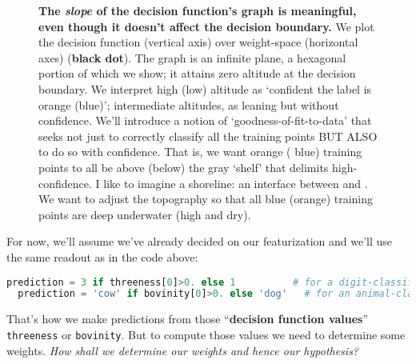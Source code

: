   \begin{figure}[h]
    \centering%
    \caption{%
      \textbf{The \emph{slope} of the decision function's graph is meaningful,
      even though it doesn't affect the decision boundary.}
      We plot the decision function (vertical axis) over
      weight-space (horizontal axes) (\textbf{black dot}).  The graph is an infinite plane, a
      hexagonal portion of which we show; it attains zero altitude
      at the {\dgre decision boundary}.
      We interpret high (low)
      altitude as `confident the label is {\rng orange} ({\blu blue})';
      intermediate altitudes, as leaning but without confidence.
      We'll introduce a notion of `goodness-of-fit-to-data'
      that seeks not just to correctly classify all the training points BUT
      ALSO to do so with confidence.  That is, we want {\rng orange} ({\blu
      blue}) training points to all be above (below) the {\dgre gray `shelf'}
      that delimits high-confidence.
      I like to imagine a shoreline: an interface between
      {} and {}.  We want to adjust the topography so
      that all {\blu blue} ({\rng orange}) training points are deep underwater (high and dry).
    }
  \end{figure}


  For now, we'll assume we've already decided on our featurization and we'll
  use the same readout as in the
  code above:
  \begin{lstlisting}[language=Python, basicstyle=\footnotesize\ttfamily]
  prediction = 3 if threeness[0]>0. else 1          # for a digit-classifying project
  prediction = 'cow' if bovinity[0]>0. else 'dog'   # for an animal-classifying project
  \end{lstlisting}
  That's how we make predictions from those ``\textbf{decision function values}''
  \texttt{threeness} or \texttt{bovinity}.  But to compute those values we
  need to determine some weights.
  \emph{How shall we determine our weights and hence our hypothesis?}

